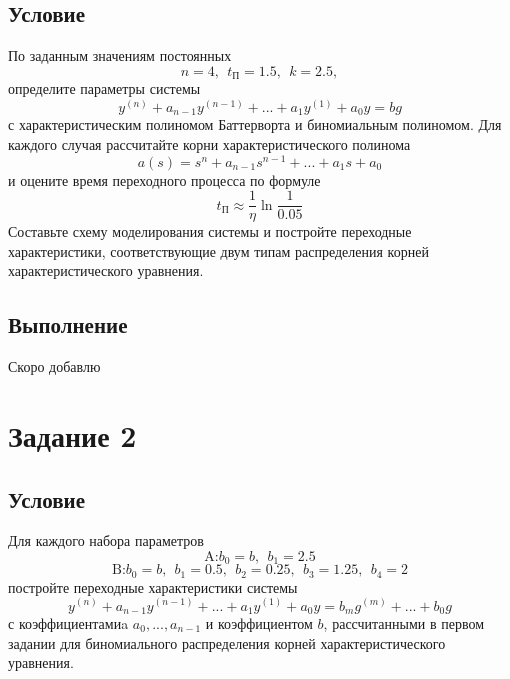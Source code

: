 \documentclass[a4paper, 12pt]{article}
\begin{document}
    \subsection{Условие}
    По заданным значениям постоянных $$n=4,\ \ t_{\text{П}}=1.5,\ \ k=2.5,$$ определите
    параметры системы $$y^{(n)}+a_{n-1}y^{(n-1)}+...+a_1y^{(1)}+a_0y=bg$$
    с характеристическим полиномом Баттерворта и биномиальным полиномом.
    Для каждого случая рассчитайте корни характеристического полинома
    $$a(s)=s^n+a_{n-1}s^{n-1}+...+a_1s+a_0$$
    и оцените время переходного процесса по формуле $$t_{\text{П}}\approx\dfrac{1}{\eta}\ln{\dfrac{1}{0.05}}$$
    Составьте схему моделирования системы и постройте переходные характеристики,
    соответствующие двум типам распределения корней характеристического уравнения.


    \subsection{Выполнение}
    Скоро добавлю


    \section{Задание 2}
    \subsection{Условие}
    Для каждого набора параметров $$\text{A:} b_0=b,\ \ b_1=2.5$$
    $$\text{B:} b_0=b,\ \ b_1=0.5,\ \ b_2=0.25,\ \ b_3=1.25,\ \ b_4=2$$
    постройте переходные характеристики системы
    $$y^{(n)}+a_{n-1}y^{(n-1)}+...+a_1y^{(1)}+a_0y=b_mg^{(m)}+...+b_0g$$
    с коэффициентамиa $a_0,...,a_{n-1}$ и коэффициентом $b$,
    рассчитанными в первом задании для биномиального распределения
    корней характеристического уравнения.
\end{document}
